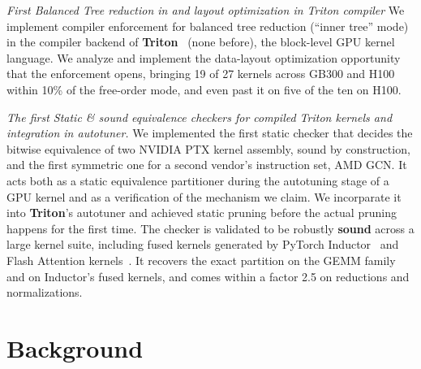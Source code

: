 \documentclass[sigplan,nonacm]{acmart}
\begin{document}

\textit{First Balanced Tree reduction in and layout optimization in Triton compiler} We
implement compiler enforcement for balanced tree reduction (``inner tree'' mode) in the
compiler backend of \textbf{Triton}~\cite{triton2019} (none before), the block-level GPU
kernel language. We analyze and implement the data-layout optimization
opportunity that the enforcement opens, bringing 19 of 27 kernels across GB300 and
H100 within 10\% of the free-order mode, and even past it on five of the ten on
H100.

\textit{The first Static \& sound equivalence checkers for compiled Triton kernels 
and integration in autotuner.} 
We implemented the first static checker that decides the bitwise equivalence
of two NVIDIA PTX kernel assembly, sound by construction, and the first
symmetric one for a second vendor's instruction set, AMD GCN.
It acts both as a static equivalence partitioner during the autotuning stage of
a GPU kernel and as a verification of the mechanism we claim. We incorparate it into
\textbf{Triton}'s autotuner and achieved static pruning before 
the actual pruning happens for the first time.
The checker is validated to be robustly \textbf{sound} across a large kernel
suite, including fused kernels generated by PyTorch
Inductor~\cite{pytorch2_2024} and Flash Attention
kernels~\cite{flashattention2022}. It recovers the exact partition on the GEMM
family and on Inductor's fused kernels, and comes within a factor 2.5 on
reductions and normalizations.




\section{Background}
\label{sec:background}
\end{document}
